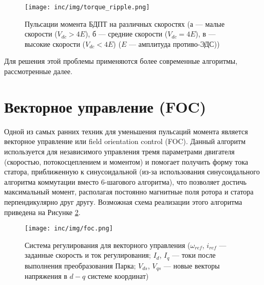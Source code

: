 \begin{figure}[!h]
\centering
\texttt{[image: inc/img/torque\_ripple.png]}
\caption{Пульсации момента БДПТ на различных скоростях (а --- малые скорости ($V_{dc}>4E$), б --- средние скорости ($V_{dc}=4E$), в --- высокие скорости ($V_{dc}<4E$) ($E$ --- амплитуда противо-ЭДС)) \cite{book.kim_motors}}
\label{pic:commut}
\end{figure}

Для решения этой проблемы применяются более современные алгоритмы, рассмотренные далее.

\section{Векторное управление (FOC)}
\label{sec:foc}

Одной из самых ранних техник для уменьшения пульсаций момента является векторное управление или field orientation control (FOC). Данный алгоритм используется для независимого управления тремя параметрами двигателя (скоростью, потокосцеплением и моментом) и помогает получить форму тока статора, приближенную к синусоидальной (из-за использования синусоидального алгоритма коммутации вместо 6-шагового алгоритма), что позволяет достичь максимальный момент, располагая постоянно магнитные поля ротора и статора перпендикулярно друг другу. Возможная схема реализации этого алгоритма приведена на Рисунке \ref{pic:foc}.

\begin{figure}[!h]
\centering
\texttt{[image: inc/img/foc.png]}
\caption{Система регулирования для векторного управления ($\omega_{ref}$, $i_{ref}$ --- заданные скорость и ток регулирования; $I_d$, $I_q$ --- токи после выполнения преобразования Парка; $V_{ds}$, $V_{qs}$ --- новые векторы напряжения в $d-q$ системе координат) \cite{art:bdlc_adv_control_techs}}
\label{pic:foc}
\end{figure}

